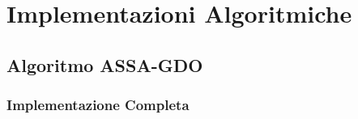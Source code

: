 
\chapter{\texorpdfstring{Implementazioni Algoritmiche}{Appendice C - Implementazioni Algoritmiche}}
\label{app:algoritmi}

\section{\texorpdfstring{Algoritmo ASSA-GDO}{C.1 - Algoritmo ASSA-GDO}}

\subsection{\texorpdfstring{Implementazione Completa}{C.1.1 - Implementazione Completa}}

